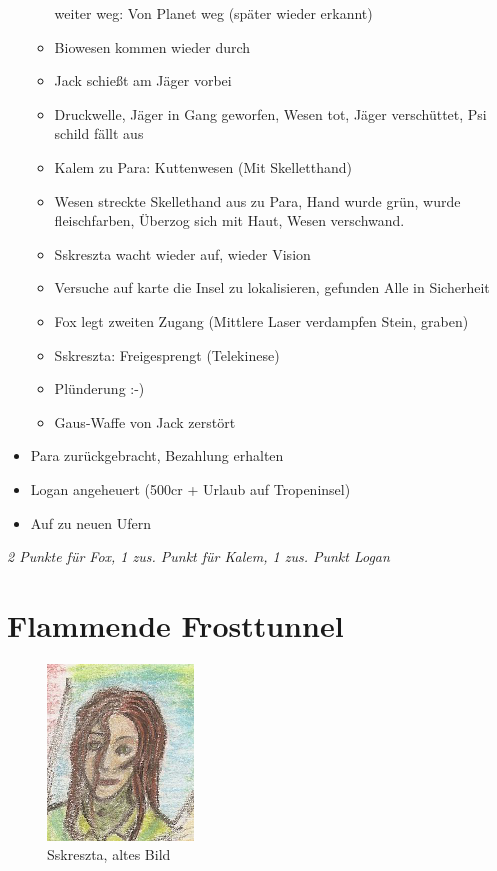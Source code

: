 \documentclass[11pt]{scrartcl}
\begin{document}
\begin{itemize}
\begin{itemize}
    weiter weg: Von Planet weg (später wieder erkannt)
  \item
    Biowesen kommen wieder durch
  \item
    Jack schießt am Jäger vorbei
  \item
    Druckwelle, Jäger in Gang geworfen, Wesen tot, Jäger verschüttet,
    Psi schild fällt aus
  \item
    Kalem zu Para: Kuttenwesen (Mit Skelletthand)
  \item
    Wesen streckte Skellethand aus zu Para, Hand wurde grün, wurde
    fleischfarben, Überzog sich mit Haut, Wesen verschwand.
  \item
    Sskreszta wacht wieder auf, wieder Vision
  \item
    Versuche auf karte die Insel zu lokalisieren, gefunden Alle in
    Sicherheit
  \item
    Fox legt zweiten Zugang (Mittlere Laser verdampfen Stein, graben)
  \item
    Sskreszta: Freigesprengt (Telekinese)
  \item
    Plünderung :-)
  \item
    Gaus-Waffe von Jack zerstört
  \end{itemize}
\item
  Para zurückgebracht, Bezahlung erhalten
\item
  Logan angeheuert (500cr + Urlaub auf Tropeninsel)
\item
  Auf zu neuen Ufern
\end{itemize}
\emph{2 Punkte für Fox, 1 zus. Punkt für Kalem, 1 zus. Punkt Logan}

\section{Flammende Frosttunnel}

\begin{figure}[htbp]
\centering
\includegraphics{sskreszta-portrait-alt-klein.png}
\caption{Sskreszta, altes Bild}
\end{figure}
\end{document}
